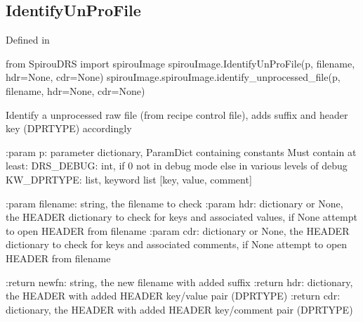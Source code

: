 \noindent\begin{minipage}{\textwidth}
\subsection{IdentifyUnProFile}

Defined in \spirouImage{}

\begin{pythonbox}
from SpirouDRS import spirouImage
spirouImage.IdentifyUnProFile(p, filename, hdr=None, cdr=None)
spirouImage.spirouImage.identify_unprocessed_file(p, filename, hdr=None, cdr=None)
\end{pythonbox}

\begin{pythondocstring}
Identify a unprocessed raw file (from recipe control file), adds suffix
and header key (DPRTYPE) accordingly

:param p: parameter dictionary, ParamDict containing constants
        Must contain at least:
            DRS_DEBUG: int, if 0 not in debug mode else in various levels of
                       debug
            KW_DPRTYPE: list, keyword list [key, value, comment]
            
:param filename: string, the filename to check
:param hdr: dictionary or None, the HEADER dictionary to check for keys and
            associated values, if None attempt to open HEADER from filename
:param cdr: dictionary or None, the HEADER dictionary to check for keys and
            associated comments, if None attempt to open HEADER from 
            filename
            
:return newfn: string, the new filename with added suffix
:return hdr: dictionary, the HEADER with added HEADER key/value pair 
             (DPRTYPE)
:return cdr: dictionary, the HEADER with added HEADER key/comment pair
             (DPRTYPE)
\end{pythondocstring}
\end{minipage}


